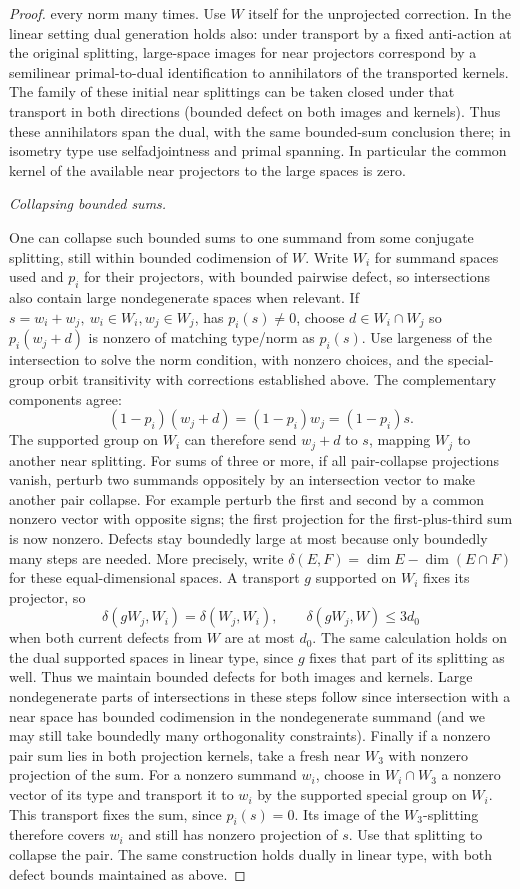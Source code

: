 \begin{proof}
every norm many times. Use \(W\) itself for the unprojected correction. In the linear setting dual
generation holds also: under transport by a fixed anti-action at the original splitting, large-space
images for near projectors correspond by a semilinear primal-to-dual identification to annihilators of
the transported kernels. The family of these initial near splittings can be taken closed under that
transport in both directions (bounded defect on both images and kernels). Thus these annihilators span
the dual, with the same bounded-sum conclusion there; in isometry type use selfadjointness and primal
spanning. In particular the common kernel of the available near projectors to the large spaces is zero.

\smallskip\noindent\emph{Collapsing bounded sums.}

One can collapse such bounded sums to one summand from some conjugate splitting, still within bounded
codimension of \(W\). Write \(W_i\) for summand spaces used and \(p_i\) for their projectors, with
bounded pairwise defect, so intersections also contain large nondegenerate spaces when relevant. If
\(s=w_i+w_j,\ w_i\in W_i,w_j\in W_j\), has \(p_i(s)\ne0\), choose \(d\in W_i\cap W_j\) so \(p_i(w_j+d)\)
is nonzero of matching type/norm as \(p_i(s)\). Use largeness of the intersection to solve the norm
condition, with nonzero choices, and the special-group orbit transitivity
with corrections established above.  The complementary components agree:
\[
 (1-p_i)(w_j+d)=(1-p_i)w_j=(1-p_i)s.
\]
The supported group on \(W_i\) can therefore send \(w_j+d\) to
\(s\), mapping \(W_j\) to another near splitting.  For sums of three or more, if all pair-collapse
projections vanish, perturb two summands oppositely by an intersection vector to make another pair
collapse. For example perturb the first and second by a common nonzero vector with opposite signs; the
first projection for the first-plus-third sum is now nonzero. Defects stay boundedly large at most
because only boundedly many steps are needed.  More precisely, write
\(\delta(E,F)=\dim E-\dim(E\cap F)\) for these equal-dimensional
spaces.  A transport \(g\) supported on \(W_i\) fixes its projector,
so
\[
 \delta(gW_j,W_i)=\delta(W_j,W_i),\qquad
 \delta(gW_j,W)\le 3d_0
\]
when both current defects from \(W\) are at most \(d_0\).
The same calculation holds on the dual supported spaces in linear
type, since \(g\) fixes that part of its splitting as well.
Thus we maintain bounded defects for both images and kernels.
Large nondegenerate parts of intersections in
these steps follow since intersection with a near space has bounded codimension in the nondegenerate
summand (and we may still take boundedly many orthogonality constraints). Finally if a nonzero pair sum
lies in both projection kernels, take a fresh near \(W_3\) with
nonzero projection of the sum.  For a nonzero summand \(w_i\),
choose in \(W_i\cap W_3\) a nonzero vector of its type and transport
it to \(w_i\) by the supported special group on \(W_i\).
This transport fixes the sum, since \(p_i(s)=0\).  Its image of
the \(W_3\)-splitting therefore covers \(w_i\) and still has
nonzero projection of \(s\).  Use that splitting to collapse the
pair.  The same construction holds dually in linear type, with
both defect bounds maintained as above.


\end{proof}
